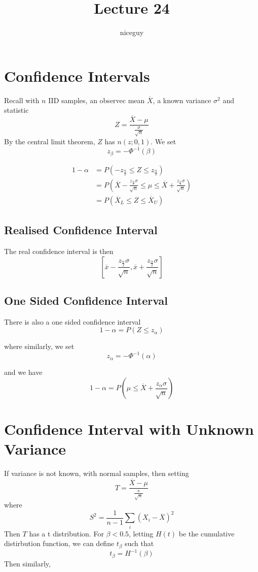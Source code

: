 \documentclass[12pt]{article}
\author{niceguy}
\title{Lecture 24}
\begin{document}
\maketitle

\section{Confidence Intervals}

Recall with $n$ IID samples, an observec mean $\overline{X}$, a known variance $\sigma^2$ and statistic
$$Z = \frac{\overline{X}-\mu}{\frac{\sigma}{\sqrt{n}}}$$
By the central limit theorem, $Z$ has $n(z;0,1)$. We set
$$z_\beta = -\Phi^{-1}(\beta)$$

\begin{align*}
	1 - \alpha &= P(-z_{\frac{\alpha}{2}} \leq Z \leq z_{\frac{\alpha}{2}}) \\
		   &= P\left(\overline{X} - \frac{z_{\frac{\alpha}{2}}\sigma}{\sqrt{n}} \leq \mu \leq \overline{X} + \frac{z_{\frac{\alpha}{2}}\sigma}{\sqrt{n}}\right) \\
		   &= P(\overline{X}_L \leq Z \leq \overline{X}_U)
\end{align*}

\subsection{Realised Confidence Interval}

The real confidence interval is then
$$\left[\overline{x} - \frac{z_{\frac{\alpha}{2}}\sigma}{\sqrt{n}}, \overline{x} + \frac{z_{\frac{\alpha}{2}}\sigma}{\sqrt{n}}\right]$$

\subsection{One Sided Confidence Interval}

There is also a one sided confidence interval
$$1 - \alpha = P(Z \leq z_\alpha)$$

where similarly, we set
$$z_\alpha = -\Phi^{-1}(\alpha)$$

and we have
$$1 - \alpha = P\left(\mu \leq \overline{X} + \frac{z_\alpha\sigma}{\sqrt{n}}\right)$$

\section{Confidence Interval with Unknown Variance}

If variance is not known, with normal samples, then setting
$$T = \frac{\overline{X}-\mu}{\frac{s}{\sqrt{n}}}$$
where
$$S^2 = \frac{1}{n-1} \sum_i\left(X_i-\overline{X}\right)^2$$
Then $T$ has a t distribution. For $\beta < 0.5$, letting $H(t)$ be the cumulative distirbution function, we can define $t_\beta$ such that
$$t_\beta = H^{-1}(\beta)$$
Then similarly,
\end{document}
